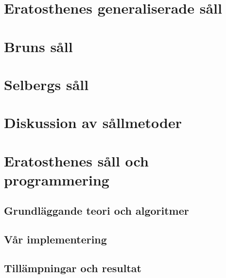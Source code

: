 \documentclass[a4paper]{article}
\begin{document}

\section{Eratosthenes generaliserade såll} \label{Eratosthenes}


\section{Bruns såll} \label{brun}


\section{Selbergs såll} \label{Selberg}


\section{Diskussion av sållmetoder}



\section{Eratosthenes såll och programmering}


\subsection{Grundläggande teori och algoritmer}


\subsection{Vår implementering}


\subsection{Tillämpningar och resultat}

\end{document}
